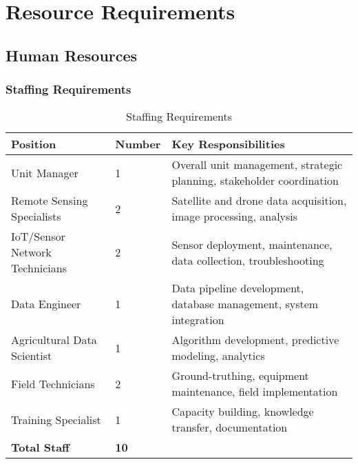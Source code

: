 \section{Resource Requirements}

\subsection{Human Resources}

\subsubsection{Staffing Requirements}
\begin{table}[H]
\centering
\begin{tabular}{lll}
\toprule
\textbf{Position} & \textbf{Number} & \textbf{Key Responsibilities} \\
\midrule
Unit Manager & 1 & Overall unit management, strategic planning, stakeholder coordination \\
Remote Sensing Specialists & 2 & Satellite and drone data acquisition, image processing, analysis \\
IoT/Sensor Network Technicians & 2 & Sensor deployment, maintenance, data collection, troubleshooting \\
Data Engineer & 1 & Data pipeline development, database management, system integration \\
Agricultural Data Scientist & 1 & Algorithm development, predictive modeling, analytics \\
Field Technicians & 2 & Ground-truthing, equipment maintenance, field implementation \\
Training Specialist & 1 & Capacity building, knowledge transfer, documentation \\
\midrule
\textbf{Total Staff} & \textbf{10} & \\
\bottomrule
\end{tabular}
\caption{Staffing Requirements}
\end{table}

